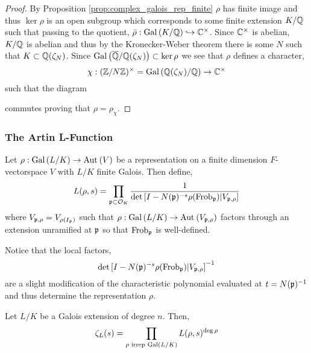 \documentclass[12pt]{article}
\begin{document}
\begin{proof}
By Proposition \ref{prop:complex_galois_rep_finite} $\rho$ has finite image and thus $\ker{\rho}$ is an open subgroup which corresponds to some finite extension $K/\mathbb{Q}$ such that passing to the quotient, $\bar{\rho} : \mathrm{Gal}\left( K/\mathbb{Q} \right) \hookrightarrow \mathbb{C}^\times$. Since $\mathbb{C}^\times$ is abelian, $K / \mathbb{Q}$ is abelian and thus by the Kronecker-Weber theorem there is some $N$ such that $K \subset \mathbb{Q}(\zeta_N)$. Since $\mathrm{Gal}\left( \overline{\mathbb{Q}}/\mathbb{Q}(\zeta_N) \right) \subset \ker{\rho}$ we see that $\rho$ defines a character,
\[ \chi : (\mathbb{Z} / N \mathbb{Z})^\times = \mathrm{Gal}\left( \mathbb{Q}(\zeta_N)/\mathbb{Q} \right) \to \mathbb{C}^\times \]
such that the diagram
\begin{center}
\end{center}
commutes proving that $\rho = \rho_\chi$.
\end{proof}

\subsubsection{The Artin L-Function}

\begin{defn}
Let $\rho : \mathrm{Gal}\left( L/K \right) \to \mathrm{Aut}_{} \left( V \right)$ be a representation on a finite dimension $F$-vectorspace $V$ with $L/K$ finite Galois. Then define,
\[ L(\rho, s) = \prod_{\mathfrak{p} \subset \mathcal{O}_{K}} \frac{1}{\det{[I - N(\mathfrak{p})^{-s} \rho(\mathrm{Frob}_{\mathfrak{p}})| V_{\mathfrak{p}, \rho}]}} \]
where $V_{\mathfrak{p}, \rho} = V_{\rho(I_{\mathfrak{p}})}$ such that $\rho : \mathrm{Gal}\left( L/K \right) \to \mathrm{Aut}_{} \left( V_{\mathfrak{p}, \rho} \right)$ factors through an extension unramified at $\mathfrak{p}$ so that $\mathrm{Frob}_{\mathfrak{p}}$ is well-defined.
\end{defn}

\begin{rmk}
Notice that the local factors, 
\[ \det{[I - N(\mathfrak{p})^{-s} \rho(\mathrm{Frob}_{\mathfrak{p}})| V_{\mathfrak{p}, \rho}]}^{-1} \]
are a slight modification of the characteristic polynomial evaluated at $t = N(\mathfrak{p})^{-1}$ and thus determine the representation $\rho$.
\end{rmk}

\begin{thm}
Let $L/K$ be a Galois extension of degree $n$. Then,
\[ \zeta_L(s) = \prod_{\rho \text{ irrep } \mathrm{Gal}\left( L/K \right)} L(\rho, s)^{\deg{\rho}} \]
\end{thm}
\end{document}

